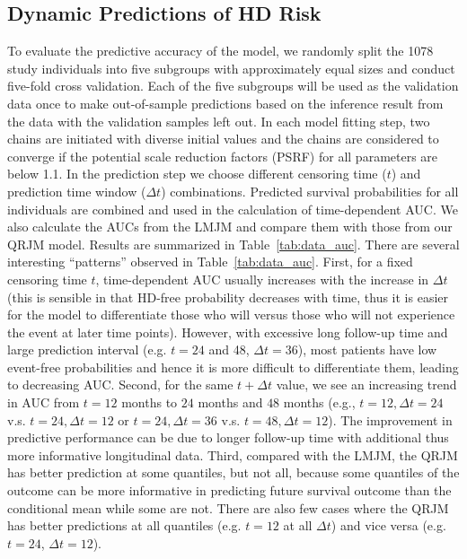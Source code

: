 \documentclass[Crown, sagev, times, doublespace]{sagej}
\begin{document}
\subsection{Dynamic Predictions of HD Risk}\label{sec:data_pred}
To evaluate the predictive accuracy of the model, we randomly split the 1078 study individuals into five subgroups with approximately equal sizes and conduct five-fold cross validation. Each of the five subgroups will be used as the validation data once to make out-of-sample predictions based on the inference result from the data with the validation samples left out. In each model fitting step, two chains are initiated with diverse initial values and the chains are considered to converge if the potential scale reduction factors (PSRF)\citep{brooks1998general} for all parameters are below 1.1. In the prediction step we choose different censoring time ($t$) and prediction time window ($\Delta t$) combinations. Predicted survival probabilities for all individuals are combined and used in the calculation of time-dependent AUC. We also calculate the AUCs from the LMJM and compare them with those from our QRJM model. Results are summarized in Table~\ref{tab:data_auc}. There are several interesting ``patterns'' observed in Table~\ref{tab:data_auc}. First, for a fixed censoring time $t$, time-dependent AUC usually increases with the increase in $\Delta t$ (this is sensible in that HD-free probability decreases with time, thus it is easier for the model to differentiate those who will versus those who will not experience the event at later time points). However, with excessive long follow-up time and large prediction interval (e.g. $t=24$ and 48, $\Delta t = 36$), most patients have low event-free probabilities and hence it is more difficult to differentiate them, leading to decreasing AUC. Second, for the same $t+\Delta t$ value, we see an increasing trend in AUC from $t=12$ months to $24$ months and  $48$ months (e.g., $t=12, \Delta t = 24$ v.s. $t=24, \Delta t=12$ or $t=24, \Delta t = 36$ v.s. $t=48, \Delta t = 12$). The improvement in predictive performance can be due to longer follow-up time with additional thus more informative longitudinal data. Third, compared with the LMJM, the QRJM has better prediction at some quantiles, but not all, because some quantiles of the outcome can be more informative in predicting future survival outcome than the conditional mean while some are not. There are also few cases where the QRJM has better predictions at all quantiles (e.g. $t=12$ at all $\Delta t$) and vice versa (e.g. $t=24$, $\Delta t=12$).
\end{document}
